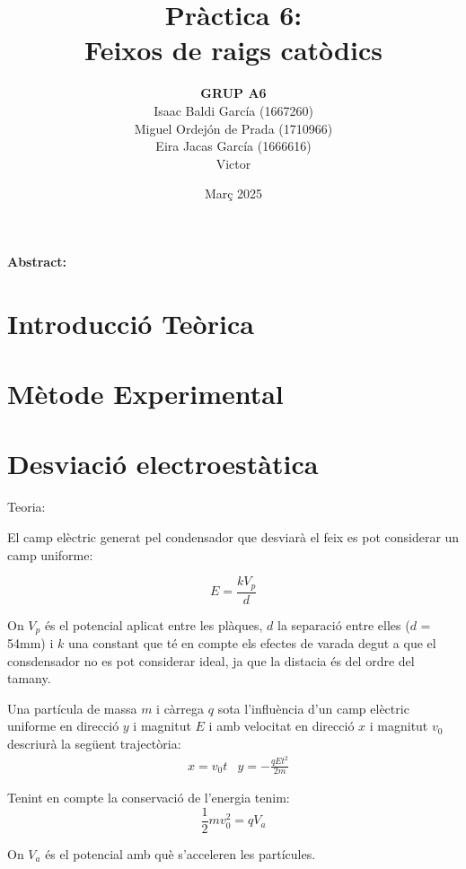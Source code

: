 \documentclass[11pt]{article}
\title{\Huge\bfseries Pràctica 6: \\ Feixos de raigs catòdics \\ [2ex] \Large}
\author{\begin{tabular}{c}
\textbf{GRUP A6} \\
Isaac Baldi García (1667260)\\
Miguel Ordejón de Prada (1710966) \\
Eira Jacas García (1666616) \\
Victor
\end{tabular}}
\date{Març 2025}
\begin{document}
\maketitle
\begin{center}
    \textbf{Abstract:} 
\end{center}


\newpage

\tableofcontents
\newpage

\section{Introducció Teòrica}

\section{Mètode Experimental} \label{sec: Met. Exp.}

\section{Desviació electroestàtica}\label{sec: desv_electr}

Teoria:

El camp elèctric generat pel condensador que desviarà el feix es pot considerar un camp uniforme:

\begin{equation}
    E = \frac{kV_p}{d}
    \label{eq: Camp E}
\end{equation}

On $V_p$ és el potencial aplicat entre les plàques, $d$ la separació entre elles ($d$ = 54mm) i $k$ una constant que té en compte els efectes de varada degut a que el consdensador no es pot considerar ideal, ja que la distacia és del ordre del tamany.

Una partícula de massa $m$ i càrrega $q$ sota l'influència d'un camp elèctric uniforme en direcció $y$ i magnitut $E$ i amb velocitat en direcció $x$ i magnitut $v_0$ descriurà la següent trajectòria:
\begin{align}
    &x = v_0 t      &y = -\frac{qEt^2}{2m}
    \label{eq: trajectoria}
\end{align}

Tenint en compte la conservació de l'energia tenim:
\begin{equation}
    \frac{1}{2}mv_0^2=qV_a
    \label{eq: Energia}
\end{equation}

On $V_a$ és el potencial amb què s'acceleren les partícules.
\end{document}
